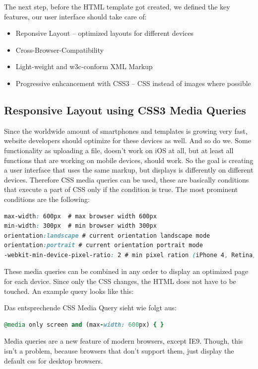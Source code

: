 The next step, before the HTML template got created, we defined the key features, our user interface should take care of:
\begin{itemize}
\item Reponsive Layout – optimized layouts for different devices
\item Cross-Browser-Compatibility
\item Light-weight and w3c-conform XML Markup
\item Progressive enhcancement with CSS3 – CSS instead of images where possible
\end{itemize}

\subsection{Responsive Layout using CSS3 Media Queries}
Since the worldwide amount of smartphones and templates is growing very fast, website developers should optimize for these devices as well. And so do we. Some functionality as uploading a file, doesn't work on iOS at all, but at least all functions that are working on mobile devices, should work. So the goal is creating a user interface that uses the same markup, but displays is differently on different devices. Therefore CSS media queries can be used, these are basically conditions that execute a part of CSS only if the condition is true. The most prominent conditions are the following:

\begingroup 
\begin{lstlisting}[caption=CSS Media Queries, label=list:cssMediaQueries, language=CSS]
max-width: 600px  # max browser width 600px
min-width: 300px  # min browser width 300px
orientation:landscape # current orientation landscape mode
orientation:portrait # current orientation portrait mode
-webkit-min-device-pixel-ratio: 2 # min pixel ration (iPhone 4, Retina)
\end{lstlisting}
\endgroup

These media queries can be combined in any order to display an optimized page for each device. Since only the CSS changes, the HTML does not have to be touched. An example query looks like this: 

Das entsprechende CSS Media Query sieht wie folgt aus:
\begin{lstlisting}[caption=CSS Media Query, label=list:cssMediaQuery, language=Ruby]
@media only screen and (max-width: 600px) { }
\end{lstlisting}

Media queries are a new feature of modern browsers, except IE9. Though, this isn't a problem, because browsers that don't support them, just display the default css for desktop browsers.

